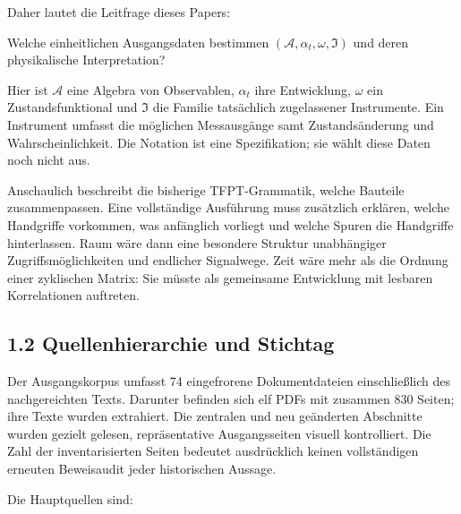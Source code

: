 Daher lautet die Leitfrage dieses Papers:

Welche einheitlichen Ausgangsdaten bestimmen
\((\mathcal A,\alpha_t,\omega,\mathfrak I)\) und deren physikalische
Interpretation?

Hier ist \(\mathcal A\) eine Algebra von Observablen, \(\alpha_t\) ihre
Entwicklung, \(\omega\) ein Zustandsfunktional und \(\mathfrak I\) die
Familie tatsächlich zugelassener Instrumente. Ein Instrument umfasst die
möglichen Messausgänge samt Zustandsänderung und Wahrscheinlichkeit. Die
Notation ist eine Spezifikation; sie wählt diese Daten noch nicht aus.

Anschaulich beschreibt die bisherige TFPT-Grammatik, welche Bauteile
zusammenpassen. Eine vollständige Ausführung muss zusätzlich erklären,
welche Handgriffe vorkommen, was anfänglich vorliegt und welche Spuren
die Handgriffe hinterlassen. Raum wäre dann eine besondere Struktur
unabhängiger Zugriffsmöglichkeiten und endlicher Signalwege. Zeit wäre
mehr als die Ordnung einer zyklischen Matrix: Sie müsste als gemeinsame
Entwicklung mit lesbaren Korrelationen auftreten.

\subsection{1.2 Quellenhierarchie und
Stichtag}\label{quellenhierarchie-und-stichtag}

Der Ausgangskorpus umfasst 74 eingefrorene Dokumentdateien
einschließlich des nachgereichten Texts. Darunter befinden sich elf PDFs
mit zusammen 830 Seiten; ihre Texte wurden extrahiert. Die zentralen und
neu geänderten Abschnitte wurden gezielt gelesen, repräsentative
Ausgangsseiten visuell kontrolliert. Die Zahl der inventarisierten
Seiten bedeutet ausdrücklich keinen vollständigen erneuten Beweisaudit
jeder historischen Aussage.

Die Hauptquellen sind:


